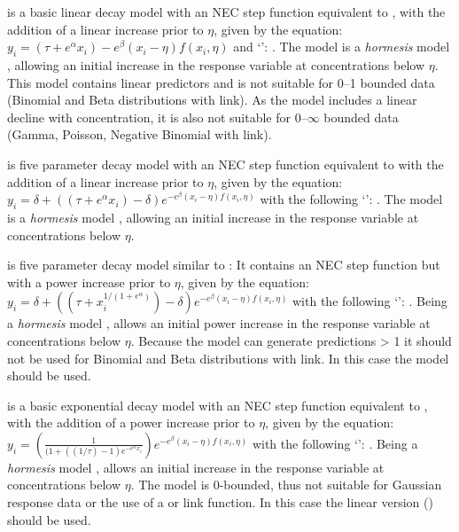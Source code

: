 \documentclass[
  shortnames]{jss}
\newcommand{\cls}[1]{`\code{#1}'}
\begin{document}
 is a basic linear decay model with an NEC step function equivalent to , with the addition of a linear increase prior to \(\eta\), given by the equation:
\(y_i = (\tau + e^{\alpha} x_i) - e^{\beta} \left(x_i - \eta \right) f(x_i, \eta)\)
and \cls{brmsformula}: . The  model is a \emph{hormesis} model \citep{Mattson2008}, allowing an initial increase in the response variable at concentrations below \(\eta\). This model contains linear predictors and is not suitable for 0--1 bounded data (Binomial and Beta distributions with  link). As the model includes a linear decline with concentration, it is also not suitable for 0--\(\infty\) bounded data (Gamma, Poisson, Negative Binomial with  link).

 is five parameter decay model with an NEC step function equivalent to  with the addition of a linear increase prior to \(\eta\), given by the equation:
\(y_i = \delta + ((\tau + e^{\alpha} x_i) - \delta ) e^{-e^{\beta} \left(x_i - \eta \right) f(x_i, \eta)}\)
with the following \cls{brmsformula}: . The  model is a \emph{hormesis} model \citep{Mattson2008}, allowing an initial increase in the response variable at concentrations below \(\eta\).

 is five parameter decay model similar to : It contains an NEC step function but with a power increase prior to \(\eta\), given by the equation:
\(y_i = \delta + ((\tau + x_i^{1 / (1+e^{\alpha})}) - \delta) e^{-e^{\beta} \left(x_i - \eta \right) f(x_i, \eta)}\)
with the following \cls{brmsformula}: . Being a \emph{hormesis} model \citep{Mattson2008},  allows an initial power increase in the response variable at concentrations below \(\eta\). Because the model can generate predictions \textgreater{} 1 it should not be used for Binomial and Beta distributions with  link. In this case the  model should be used.

 is a basic exponential decay model with an NEC step function equivalent to , with the addition of a power increase prior to \(\eta\), given by the equation:
\(y_i = \left(\frac{1}{(1 + ((1 / \tau)-1) e^{-e^{\alpha}x_i}}\right) e^{-e^{\beta} \left(x_i - \eta \right) f(x_i, \eta)}\)
with the following \cls{brmsformula}: . \linebreak Being a \emph{hormesis} model \citep{Mattson2008},  allows an initial increase in the response variable at concentrations below \(\eta\). The model is 0-bounded, thus not suitable for Gaussian response data or the use of a  or  link function. In this case the linear version () should be used.
\end{document}
